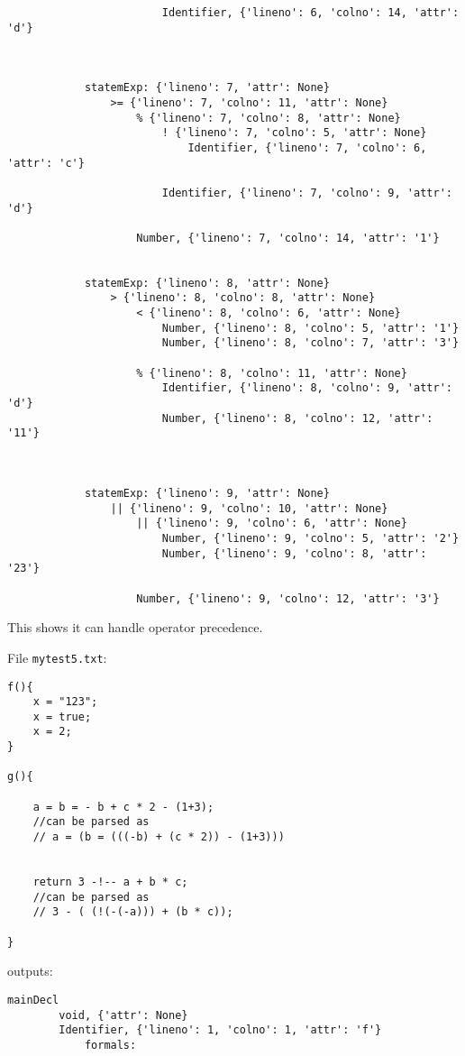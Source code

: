 \documentclass{article}
\begin{document}
\begin{itemize}
\begin{verbatim}
                        Identifier, {'lineno': 6, 'colno': 14, 'attr': 'd'}



            statemExp: {'lineno': 7, 'attr': None}
                >= {'lineno': 7, 'colno': 11, 'attr': None}
                    % {'lineno': 7, 'colno': 8, 'attr': None}
                        ! {'lineno': 7, 'colno': 5, 'attr': None}
                            Identifier, {'lineno': 7, 'colno': 6, 'attr': 'c'}

                        Identifier, {'lineno': 7, 'colno': 9, 'attr': 'd'}

                    Number, {'lineno': 7, 'colno': 14, 'attr': '1'}


            statemExp: {'lineno': 8, 'attr': None}
                > {'lineno': 8, 'colno': 8, 'attr': None}
                    < {'lineno': 8, 'colno': 6, 'attr': None}
                        Number, {'lineno': 8, 'colno': 5, 'attr': '1'}
                        Number, {'lineno': 8, 'colno': 7, 'attr': '3'}

                    % {'lineno': 8, 'colno': 11, 'attr': None}
                        Identifier, {'lineno': 8, 'colno': 9, 'attr': 'd'}
                        Number, {'lineno': 8, 'colno': 12, 'attr': '11'}



            statemExp: {'lineno': 9, 'attr': None}
                || {'lineno': 9, 'colno': 10, 'attr': None}
                    || {'lineno': 9, 'colno': 6, 'attr': None}
                        Number, {'lineno': 9, 'colno': 5, 'attr': '2'}
                        Number, {'lineno': 9, 'colno': 8, 'attr': '23'}

                    Number, {'lineno': 9, 'colno': 12, 'attr': '3'}
        \end{verbatim}
        This shows it can handle operator precedence.

        File \verb|mytest5.txt|:
        \begin{verbatim}
f(){
    x = "123";
    x = true;
    x = 2;
}

g(){

    a = b = - b + c * 2 - (1+3);
    //can be parsed as
    // a = (b = (((-b) + (c * 2)) - (1+3)))


    return 3 -!-- a + b * c;
    //can be parsed as
    // 3 - ( (!(-(-a))) + (b * c));

}
        \end{verbatim}
        outputs:
        \begin{verbatim}
mainDecl
        void, {'attr': None}
        Identifier, {'lineno': 1, 'colno': 1, 'attr': 'f'}
            formals:


\end{verbatim}
\end{itemize}
\end{document}
